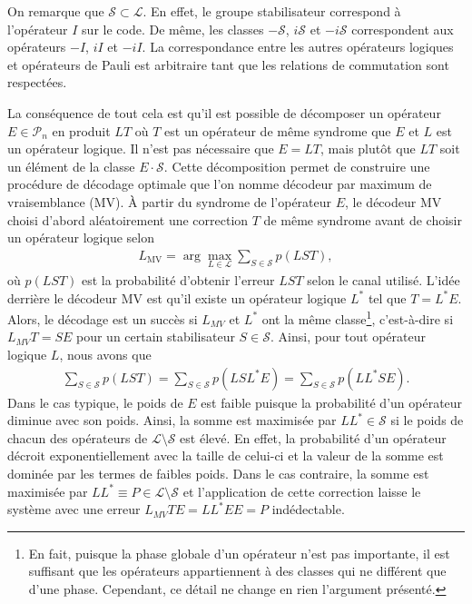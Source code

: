 On remarque que $\mathcal S \subset \mathcal L$.
En effet, le groupe stabilisateur correspond à l'opérateur $I$ sur le code.
De même, les classes $-\mathcal S$, $i\mathcal S$ et $-i\mathcal S$ correspondent
aux opérateurs $-I$, $iI$ et $-iI$.
La correspondance entre les autres opérateurs logiques et opérateurs de Pauli est
arbitraire tant que les relations de commutation sont respectées.

La conséquence de tout cela est qu'il est possible de décomposer un opérateur
$E \in \mathcal P_n$ en produit $LT$ où $T$ est un opérateur de même syndrome que $E$
et $L$ est un opérateur logique.
Il n'est pas nécessaire que $E = LT$, mais plutôt que $LT$ soit un élément de la classe $E \cdot \mathcal S$.
Cette décomposition permet de construire une procédure de décodage optimale que l'on 
nomme décodeur par maximum de vraisemblance (MV).
À partir du syndrome de l'opérateur $E$, 
le décodeur MV choisi d'abord aléatoirement une correction $T$ de même syndrome avant
de choisir un opérateur logique selon
\begin{align}
  L_{\text{MV}} = \arg\max_{L \in \mathcal L} \sum_{S \in \mathcal S} p(LST),
\end{align}
où $p(LST)$ est la probabilité d'obtenir l'erreur $LST$ selon le canal utilisé.
L'idée derrière le décodeur MV est qu'il existe un opérateur logique $L^*$ tel que $T = L^*E$.
Alors, le décodage est un succès si $L_{MV}$ et $L^*$ ont la même classe\footnote{
  En fait, puisque la phase globale d'un opérateur n'est pas importante,
  il est suffisant que les opérateurs appartiennent à des classes qui ne différent
  que d'une phase.
  Cependant, ce détail ne change en rien l'argument présenté.
},
c'est-à-dire si $L_{MV}T = SE$ pour un certain stabilisateur $S \in \mathcal S$.
Ainsi, pour tout opérateur logique $L$, nous avons que 
\begin{align}
  \sum_{S\in \mathcal S} p(LST)
  =
  \sum_{S\in \mathcal S} p(LSL^*E)
  =
  \sum_{S\in \mathcal S} p(LL^*SE).
\end{align}
Dans le cas typique,
le poids de $E$ est faible puisque la probabilité d'un opérateur diminue avec son poids.
Ainsi, la somme est maximisée par $LL^* \in \mathcal S$ si le poids de chacun des opérateurs de
$\mathcal L \setminus \mathcal S$ est élevé.
En effet, la probabilité d'un opérateur décroit exponentiellement avec la taille de celui-ci
et la valeur de la somme est dominée par les termes de faibles poids.
Dans le cas contraire,
la somme est maximisée par $LL^* \equiv P \in \mathcal L \setminus \mathcal S$ 
et l'application de cette correction laisse le système avec une erreur $L_{MV}TE = LL^*EE = P$ indédectable.

